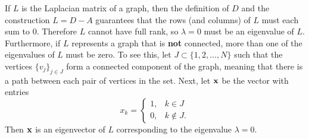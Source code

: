If $L$ is the Laplacian matrix of a graph, then the definition of $D$ and the construction $L = D - A$ guarantees that the rows (and columns) of $L$ must each sum to $0$.
Therefore $L$ cannot have full rank, so $\lambda = 0$ must be an eigenvalue of $L$.
Furthermore, if $L$ represents a graph that is \textbf{not} connected, more than one of the eigenvalues of $L$ must be zero.
To see this, let $J \subset \{1,2,\ldots,N\}$ such that the vertices $\{v_j\}_{j \in J}$ form a connected component of the graph, meaning that there is a path between each pair of vertices in the set.
Next, let $\mathbf{x}$ be the vector with entries
 \[
x_k = \begin{cases}
1, & k \in J    \\
0, & k \not\in J.
\end{cases}
  \]
Then $\mathbf{x}$ is an eigenvector of $L$ corresponding to the eigenvalue $\lambda = 0$.

